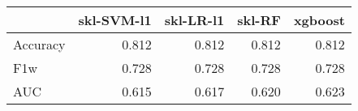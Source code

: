 \begin{tabular}{lrrrr}
\toprule
{} &  skl-SVM-l1 &  skl-LR-l1 &  skl-RF &  xgboost \\
\midrule
Accuracy &       0.812 &      0.812 &   0.812 &    0.812 \\
F1w      &       0.728 &      0.728 &   0.728 &    0.728 \\
AUC      &       0.615 &      0.617 &   0.620 &    0.623 \\
\bottomrule
\end{tabular}
